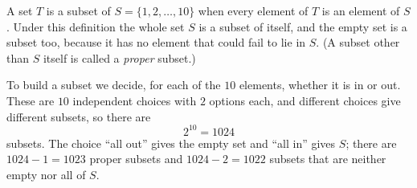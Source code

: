 A set $T$ is a subset of $S=\{1,2,\dots,10\}$ when every element of $T$ is an element of $S$. Under this definition the whole set $S$ is a subset of itself, and the empty set is a subset too, because it has no element that could fail to lie in $S$. (A subset other than $S$ itself is called a \emph{proper} subset.)

To build a subset we decide, for each of the $10$ elements, whether it is in or out. These are $10$ independent choices with $2$ options each, and different choices give different subsets, so there are
\[
2^{10}=\boxed{1024}
\]
subsets. The choice ``all out'' gives the empty set and ``all in'' gives $S$; there are $1024-1=1023$ proper subsets and $1024-2=1022$ subsets that are neither empty nor all of $S$.

